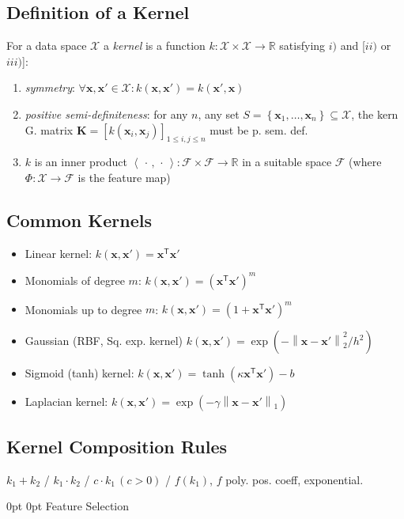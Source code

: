 \documentclass[a4paper,8pt,landscape]{extarticle}
\makeatletter
\newcommand{\R}{\mathbb{R}}
\newcommand{\cF}{\mathcal{F}}
\newcommand{\cX}{\mathcal{X}}
\newcommand{\set}[1]{\left\{ #1 \right\}}
\newcommand{\norm}[1]{\left\lVert #1 \right\rVert}
\newcommand{\iprod}[1]{\left\langle #1 \right\rangle}
\newcommand*{\T}{\mathsf{T}}
\newcommand{\mat}[1]{\mathbf{#1}}
\renewcommand{\vec}[1]{\mathbf{#1}}
\newcommand{\vx}{\vec{x}}
\newcommand{\MK}{\mat{K}}
\newcommand{\argdot}{\,\cdot\,}
\newcommand*{\mybox}[1]{%
    \noindent\colorbox{sectionbarcolor}{%
        \parbox{\dimexpr\columnwidth-2\fboxsep\relax}{%
            \textcolor{white}{#1}}}}
\newcommand*{\mybox}[1]{%
    \noindent\colorbox{sectioncolor}{%
        \parbox{\dimexpr\columnwidth-2\fboxsep\relax}{%
            \textcolor{white}{#1}}}}
\renewcommand\section{\@startsection {section}{1}{\z@}%
                                   {0pt}%
                                   {0pt}%
                                   {\normalfont\bfseries\mybox}}
\makeatother
\begin{document}
\begin{multicols*}{3}
\subsection{Definition of a Kernel}

For a data space $\cX$	a \emph{kernel} is a function
$k\colon\cX\times\cX\to\R$ satisfying $i)$ and [$ii)$ or $iii)$]:
\begin{enumerate}[label=\roman*)]
  \item \emph{symmetry}: $\forall\vx,\vx'\in\cX\colon k(\vx,\vx')=k(\vx',\vx)$
  \item \emph{positive semi-definiteness}: for any $n$, any set
  $S=\set{\vx_1,\ldots,\vx_n}\subseteq\cX$, the kern G. matrix
  $\MK=[k(\vx_i,\vx_j)]_{1\leq i,j\leq n}$
  must be p. sem. def.
  \item $k$ is an inner product
  $\iprod{\argdot,\argdot}\colon\cF\times\cF\to\R$ in a suitable space 
  $\cF$ (where $\Phi\colon\cX\to\cF$ is the feature map)
\end{enumerate}

\subsection{Common Kernels}

\begin{itemize}
  \item Linear kernel: $k(\vx,\vx')=\vx^\T\vx'$
  \item Monomials of degree $m$: $k(\vx,\vx')=(\vx^\T\vx')^m$
  \item Monomials up to degree $m$: $k(\vx,\vx')=(1+\vx^\T\vx')^m$ 
  \item Gaussian (RBF, Sq. exp. kernel)
  $k(\vx,\vx')=\exp(-\norm{\vx-\vx'}_2^2/h^2)$
  \item Sigmoid (tanh) kernel: $k(\vx,\vx')=\tanh(\kappa\vx^\T\vx')-b$
  \item Laplacian kernel: $k(\vx,\vx')=\exp(-\gamma \norm{\vx-\vx'}_1)$
\end{itemize}

\subsection{Kernel Composition Rules}

$k_1+k_2$ / $k_1\cdot k_2$ / $c\cdot k_1\, (c>0)$ / $f(k_1)$, $f$ poly. pos.
coeff, exponential.

\section{Feature Selection}


\end{multicols*}
\end{document}

